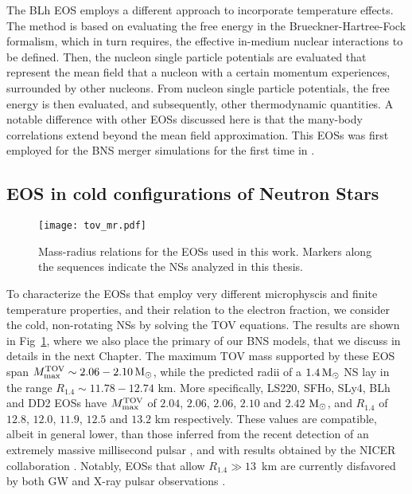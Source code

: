 The BLh \ac{EOS} employs a different approach to incorporate temperature effects.
The method is based on evaluating the free energy in the Brueckner-Hartree-Fock formalism, 
which in turn requires, the effective in-medium nuclear interactions to be defined.
%
Then, the nucleon single particle potentials are evaluated %
that represent the mean field that a nucleon with a certain momentum experiences, 
surrounded by other nucleons. From nucleon single particle potentials, the free energy 
is then evaluated, and subsequently, other thermodynamic quantities. 
A notable difference 
with other \acp{EOS} discussed here is that the many-body correlations extend beyond the 
mean field approximation. %
%
This \acp{EOS} was first employed for the \ac{BNS} merger 
simulations for the first time in \citet{Bernuzzi:2020txg}.



\subsection{\ac{EOS} in cold configurations of Neutron Stars}


\begin{figure}[t]
    \centering 
    \texttt{[image: tov\_mr.pdf]}
    \caption{
        Mass-radius relations for the \acp{EOS} used in this work. 
        Markers along the sequences indicate the \acp{NS} analyzed in this thesis.
    }  
    \label{fig:method:tov_mr}
\end{figure}
To characterize the \acp{EOS} that employ very different microphyscis and finite 
temperature properties, and their relation to the electron fraction, we consider 
the cold, non-rotating \acp{NS} by solving the \ac{TOV} equations.
The results are shown in Fig~\ref{fig:method:tov_mr}, where we also place 
the primary of our \ac{BNS} models, that we discuss in details in the next Chapter. 
%
The maximum \ac{TOV} mass supported by these \ac{EOS} span  
$M_\text{max}^\text{TOV} \sim 2.06-2.10\,{\text{M}_{\odot}}$, while the predicted radii of a $1.4\,{\text{M}_{\odot}}$ 
\ac{NS} lay in the range $R_{1.4}\sim 11.78-12.74$ km. 
More specifically, LS220, SFHo, SLy4, BLh and DD2 \acp{EOS} have 
$M_\text{max}^\text{TOV}$ of $2.04$, $2.06$, $2.06$, $2.10$ and $2.42$ ${\text{M}_{\odot}}$, and 
$R_{1.4}$ of $12.8$, $12.0$, $11.9$, $12.5$ and $13.2$ km respectively. 
%
These values are compatible, albeit in general lower, than those inferred from the 
recent detection of an extremely massive millisecond pulsar \citep{Cromartie:2019kug},  
and with results obtained by the NICER collaboration \citep{Miller:2019cac,Riley:2019yda}.
Notably, \acp{EOS} that allow $R_{1.4}\gg 13$~km are currently disfavored by both 
\ac{GW} \GW{} and X-ray pulsar observations \citep{Abbott:2018wiz,Miller:2019cac,Riley:2019yda}.

